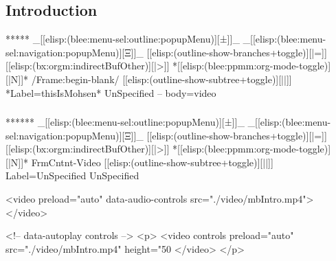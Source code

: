 \begin{whenOrg}
\section{Introduction}


\begin{whenOrg}
*****  _[[elisp:(blee:menu-sel:outline:popupMenu)][±]]_ _[[elisp:(blee:menu-sel:navigation:popupMenu)][Ξ]]_ [[elisp:(outline-show-branches+toggle)][|=]] [[elisp:(bx:orgm:indirectBufOther)][|>]] *[[elisp:(blee:ppmm:org-mode-toggle)][|N]]*  /Frame:begin-blank/ [[elisp:(outline-show-subtree+toggle)][||]] *Label=thisIsMohsen* UnSpecified -- body=video
\end{whenOrg}

\begin{frame}[fragile,plain,label=thisIsMohsen]
    \frametitle{}

\begin{whenOrg}
******  _[[elisp:(blee:menu-sel:outline:popupMenu)][±]]_ _[[elisp:(blee:menu-sel:navigation:popupMenu)][Ξ]]_ [[elisp:(outline-show-branches+toggle)][|=]] [[elisp:(bx:orgm:indirectBufOther)][|>]] *[[elisp:(blee:ppmm:org-mode-toggle)][|N]]*  FrmCntnt-Video [[elisp:(outline-show-subtree+toggle)][||]] Label=UnSpecified UnSpecified
\end{whenOrg}
\begin{presentationMode}
\begin{htmlonly}
  \begin{rawhtml}
<video preload="auto" data-audio-controls src="./video/mbIntro.mp4"></video>
  \end{rawhtml}
\end{htmlonly}
\end{presentationMode}

\begin{articleMode}
\begin{htmlonly}
  \begin{rawhtml}
      <!-- data-autoplay  controls -->
    <p>
    <video  controls   preload="auto"  src="./video/mbIntro.mp4"  height="50%
    </video>
    </p>
  \end{rawhtml}
\end{htmlonly}
\end{articleMode}


\end{frame}
\end{whenOrg}
